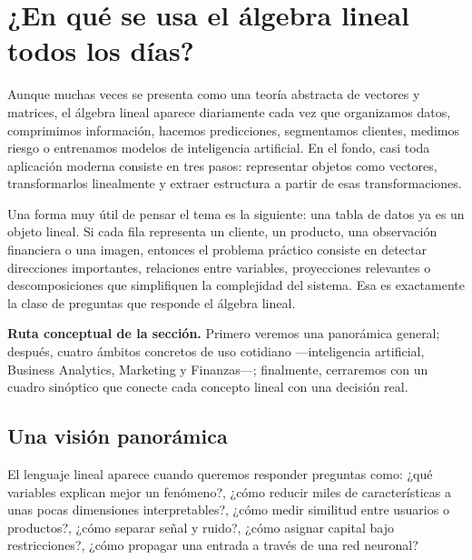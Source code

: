 \documentclass[10pt,a4paper,oneside]{article}
\theoremstyle{plain}
\theoremstyle{definition}
\theoremstyle{remark}
\begin{document}
\section{¿En qué se usa el álgebra lineal todos los días?}
\begin{ideaBox}
Aunque muchas veces se presenta como una teoría abstracta de vectores y matrices, el álgebra lineal aparece diariamente cada vez que organizamos datos, comprimimos información, hacemos predicciones, segmentamos clientes, medimos riesgo o entrenamos modelos de inteligencia artificial. En el fondo, casi toda aplicación moderna consiste en tres pasos: representar objetos como vectores, transformarlos linealmente y extraer estructura a partir de esas transformaciones.
\end{ideaBox}

\begin{intuitionBox}
Una forma muy útil de pensar el tema es la siguiente: una tabla de datos ya es un objeto lineal. Si cada fila representa un cliente, un producto, una observación financiera o una imagen, entonces el problema práctico consiste en detectar direcciones importantes, relaciones entre variables, proyecciones relevantes o descomposiciones que simplifiquen la complejidad del sistema. Esa es exactamente la clase de preguntas que responde el álgebra lineal.
\end{intuitionBox}

\begin{summaryBox}
\textbf{Ruta conceptual de la sección.} Primero veremos una panorámica general; después, cuatro ámbitos concretos de uso cotidiano ---inteligencia artificial, Business Analytics, Marketing y Finanzas---; finalmente, cerraremos con un cuadro sinóptico que conecte cada concepto lineal con una decisión real.
\end{summaryBox}

\subsection{Una visión panorámica}

\vspace{0.55em}

El lenguaje lineal aparece cuando queremos responder preguntas como: ¿qué variables explican mejor un fenómeno?, ¿cómo reducir miles de características a unas pocas dimensiones interpretables?, ¿cómo medir similitud entre usuarios o productos?, ¿cómo separar señal y ruido?, ¿cómo asignar capital bajo restricciones?, ¿cómo propagar una entrada a través de una red neuronal?
\end{document}
